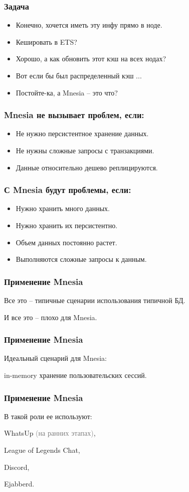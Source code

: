 \documentclass[10pt]{beamer}
\begin{document}
\begin{frame}
\frametitle{Задача}
\begin{itemize}[<+->]
\item Конечно, хочется иметь эту инфу прямо в ноде.
\item Кешировать в ETS?
\item Хорошо, а как обновить этот кэш на всех нодах?
\item Вот если бы был распределенный кэш ...
\item Постойте-ка, а Mnesia -- это что?
\end{itemize}
\end{frame}

\begin{frame}
\frametitle{Mnesia не вызывает проблем, если:}
\begin{itemize}
\item Не нужно персистентное хранение данных.
\item Не нужны сложные запросы с транзакциями.
\item Данные относительно дешево реплицируются.
\end{itemize}
\end{frame}

\begin{frame}
\frametitle{С Mnesia будут проблемы, если:}
\begin{itemize}
\item Нужно хранить много данных.
\item Нужно хранить их персистентно.
\item Объем данных постоянно растет.
\item Выполняются сложные запросы к данным.
\end{itemize}
\end{frame}

\begin{frame}
\frametitle{Применение Mnesia}
\centering
Все это -- типичные сценарии использования типичной БД.
\par \bigskip
И все это -- плохо для Mnesia.
\end{frame}

\begin{frame}
\frametitle{Применение Mnesia}
\centering
Идеальный сценарий для Mnesia:
\par \bigskip
in-memory хранение пользовательских сессий.
\end{frame}

\begin{frame}
\frametitle{Применение Mnesia}
\centering
В такой роли ее используют:
\par \bigskip
WhatsUp \textcolor{gray}{(на ранних этапах)},
\par \bigskip
League of Legends Chat,
\par \bigskip
Discord,
\par \bigskip
Ejabberd.
\end{frame}
\end{document}
